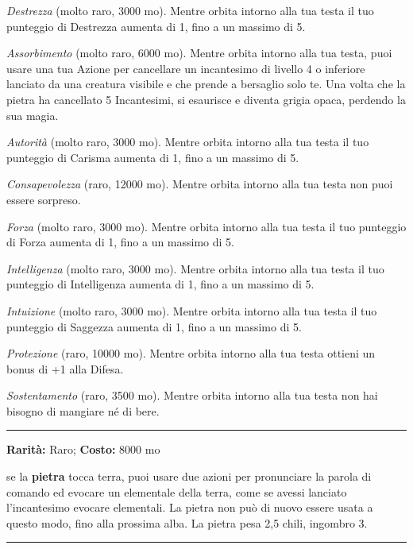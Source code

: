 \begin{multicols}{2}
\emph{Destrezza} (molto raro, 3000 mo). Mentre orbita intorno alla tua testa il tuo punteggio di Destrezza aumenta di 1, fino a un massimo di 5.

\emph{Assorbimento} (molto raro, 6000 mo). Mentre orbita intorno alla tua testa, puoi usare una tua Azione per cancellare un incantesimo di livello 4 o inferiore lanciato da una creatura visibile e che prende a bersaglio solo te. Una volta che la pietra ha cancellato 5 Incantesimi, si esaurisce e diventa grigia opaca, perdendo la sua magia.

\emph{Autorità} (molto raro, 3000 mo). Mentre orbita intorno alla tua testa il tuo punteggio di Carisma aumenta di 1, fino a un massimo di 5.

\emph{Consapevolezza} (raro, 12000 mo). Mentre orbita intorno alla tua testa non puoi essere sorpreso.

\emph{Forza} (molto raro, 3000 mo). Mentre orbita intorno alla tua testa il tuo punteggio di Forza aumenta di 1, fino a un massimo di 5.

\emph{Intelligenza} (molto raro, 3000 mo). Mentre orbita intorno alla tua testa il tuo punteggio di Intelligenza aumenta di 1, fino a un massimo di 5.

\emph{Intuizione} (molto raro, 3000 mo). Mentre orbita intorno alla tua testa il tuo punteggio di Saggezza aumenta di 1, fino a un massimo di 5.

\emph{Protezione} (raro, 10000 mo). Mentre orbita intorno alla tua testa ottieni un bonus di +1 alla Difesa.

\emph{Sostentamento} (raro, 3500 mo). Mentre orbita intorno alla tua testa non hai bisogno di mangiare né di bere.

\smallskip\noindent\rule{\linewidth}{2pt}  \hypertarget{PietradegliElementalidellaTerra}{}\smallskip{}\noindent\label{PietradegliElementalidellaTerra}

\textbf{Rarità:} Raro; \textbf{Costo:} 8000 mo

se la \textbf{pietra} tocca terra, puoi usare due azioni per pronunciare la parola di comando ed evocare un elementale della terra, come se avessi lanciato l'incantesimo evocare elementali. La pietra non può di nuovo essere usata a questo modo, fino alla prossima alba. La pietra pesa 2,5 chili, ingombro 3.

\smallskip\noindent\rule{\linewidth}{2pt}  \hypertarget{PietradelPeso}{}\smallskip{}\noindent\label{PietradelPeso}


\end{multicols}
